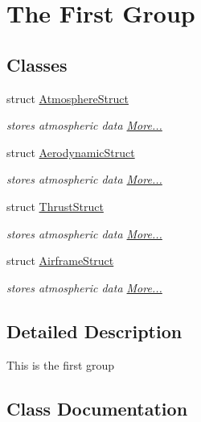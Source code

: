 \hypertarget{group__group1}{}\section{The First Group}
\label{group__group1}
\subsection*{Classes}
\begin{DoxyCompactItemize}
\item 
struct \hyperlink{group__group1_struct_atmosphere_struct}{Atmosphere\+Struct}
\begin{DoxyCompactList}\small\item\em stores atmospheric data  \hyperlink{group__group1_struct_atmosphere_struct}{More...}\end{DoxyCompactList}\item 
struct \hyperlink{group__group1_struct_aerodynamic_struct}{Aerodynamic\+Struct}
\begin{DoxyCompactList}\small\item\em stores atmospheric data  \hyperlink{group__group1_struct_aerodynamic_struct}{More...}\end{DoxyCompactList}\item 
struct \hyperlink{group__group1_struct_thrust_struct}{Thrust\+Struct}
\begin{DoxyCompactList}\small\item\em stores atmospheric data  \hyperlink{group__group1_struct_thrust_struct}{More...}\end{DoxyCompactList}\item 
struct \hyperlink{group__group1_struct_airframe_struct}{Airframe\+Struct}
\begin{DoxyCompactList}\small\item\em stores atmospheric data  \hyperlink{group__group1_struct_airframe_struct}{More...}\end{DoxyCompactList}\end{DoxyCompactItemize}


\subsection{Detailed Description}
This is the first group 

\subsection{Class Documentation}
\label{struct_atmosphere_struct}
